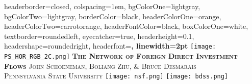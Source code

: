 \documentclass[landscape,a0paper,fontscale=0.285]{baposter} %
\begin{document}
\begin{poster}
{
headerborder=closed, %
colspacing=1em, %
bgColorOne=lightgray, %
bgColorTwo=lightgray, %
borderColor=black, %
headerColorOne=orange, %
headerColorTwo=carrotorange, %
headerFontColor=black, %
boxColorOne=white, %
textborder=roundedleft, %
eyecatcher=true, %
headerheight=0.1\textheight, %
headershape=roundedright, %
headerfont=\Large\bf\textsc, %
linewidth=2pt %
}
%
{\texttt{[image: PS\_HOR\_RGB\_2C.png]}} %
{\bf\textsc{The Network of Foreign Direct Investment Flows}\vspace{0.5em}} %
{\textsc{John Schoeneman, Boliang Zhu, \& Bruce Desmarais\\
Pennsylvania State University}} %
{
{\texttt{[image: nsf.png]}} %
{\texttt{[image: bdss.png]}}
}

\end{poster}
\end{document}
